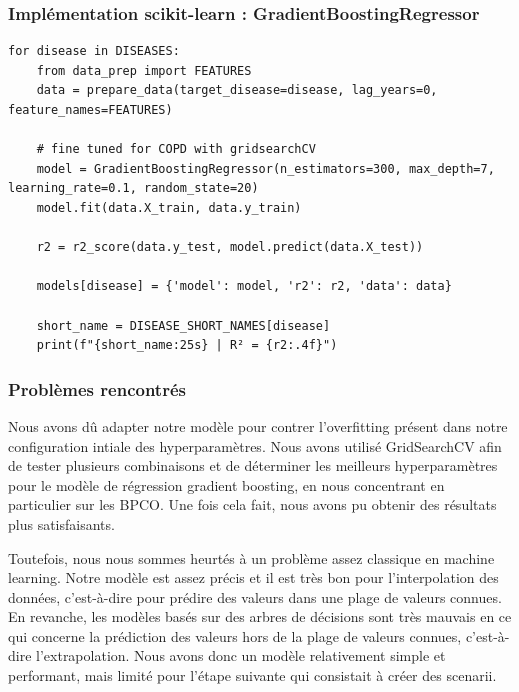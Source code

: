 \documentclass[11pt,a4paper]{article}
\begin{document}
\subsubsection{Implémentation scikit-learn : GradientBoostingRegressor}

\begin{listing}[H]
\caption{Modèle scikit-learn final}
\label{lst:sklearn_model}
\begin{lstlisting}[style=pythonstyle]
for disease in DISEASES:
    from data_prep import FEATURES
    data = prepare_data(target_disease=disease, lag_years=0, feature_names=FEATURES)

    # fine tuned for COPD with gridsearchCV
    model = GradientBoostingRegressor(n_estimators=300, max_depth=7, learning_rate=0.1, random_state=20)
    model.fit(data.X_train, data.y_train)

    r2 = r2_score(data.y_test, model.predict(data.X_test))

    models[disease] = {'model': model, 'r2': r2, 'data': data}

    short_name = DISEASE_SHORT_NAMES[disease]
    print(f"{short_name:25s} | R² = {r2:.4f}")

\end{lstlisting}
\end{listing}

\subsubsection{Problèmes rencontrés}

Nous avons dû adapter notre modèle pour contrer l'overfitting présent dans notre configuration intiale des hyperparamètres. Nous avons utilisé GridSearchCV afin de tester plusieurs combinaisons et de déterminer les meilleurs hyperparamètres pour le modèle de régression gradient boosting, en nous concentrant en particulier sur les BPCO. Une fois cela fait, nous avons pu obtenir des résultats plus satisfaisants.

Toutefois, nous nous sommes heurtés à un problème assez classique en machine learning. Notre modèle est assez précis et il est très bon pour l'interpolation des données, c'est-à-dire pour prédire des valeurs dans une plage de valeurs connues. En revanche, les modèles basés sur des arbres de décisions sont très mauvais en ce qui concerne la prédiction des valeurs hors de la plage de valeurs connues, c'est-à-dire l'extrapolation. Nous avons donc un modèle relativement simple et performant, mais limité pour l'étape suivante qui consistait à créer des scenarii.
\end{document}

